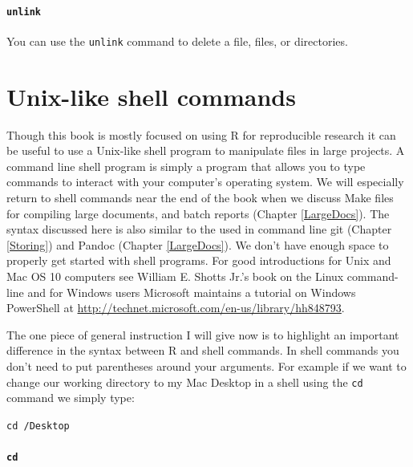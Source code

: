 \documentclass[ChapterTOCs,krantz1]{krantz}\usepackage{graphicx, color}
\makeatletter
\newenvironment{kframe}{%
 \def\at@end@of@kframe{}%
 \ifinner\ifhmode%
  \def\at@end@of@kframe{\end{minipage}}%
  \begin{minipage}{\columnwidth}%
 \fi\fi%
 \def\FrameCommand##1{\hskip\@totalleftmargin \hskip-\fboxsep
 \colorbox{shadecolor}{##1}\hskip-\fboxsep
     \hskip-\linewidth \hskip-\@totalleftmargin \hskip\columnwidth}%
 \MakeFramed {\advance\hsize-\width
   \@totalleftmargin\z@ \linewidth\hsize
   \@setminipage}}%
 {\par\unskip\endMakeFramed%
 \at@end@of@kframe}
\newenvironment{knitrout}{}{} %
\makeatother
\begin{document}
\paragraph{{\tt{unlink}}}

You can use the {\tt{unlink}} command to delete a file, files, or directories. 

\section{Unix-like shell commands} 

Though this book is mostly focused on using R for reproducible research it can be useful to use a Unix-like shell program to manipulate files in large projects. A command line shell program is simply a program that allows you to type commands to interact with your computer's operating system.\cite{ShottsJr2012} We will especially return to shell commands near the end of the book when we discuss Make files for compiling large documents, and batch reports (Chapter \ref{LargeDocs}). The syntax discussed here is also similar to the used in command line git (Chapter \ref{Storing}) and Pandoc (Chapter \ref{LargeDocs}). We don't have enough space to properly get started with shell programs. For good introductions for Unix and Mac OS 10 computers see William E. Shotts Jr.'s book on the Linux command-line\cite{ShottsJr2012} and for Windows users Microsoft maintains a tutorial on Windows PowerShell at \url{http://technet.microsoft.com/en-us/library/hh848793}.

The one piece of general instruction I will give now is to highlight an important difference in the syntax between R and shell commands. In shell commands you don't need to put parentheses around your arguments. For example if we want to change our working directory to my Mac Desktop in a shell using the {\tt{cd}} command we simply type:

\begin{knitrout}
\color{fgcolor}\begin{kframe}
\begin{alltt}
cd ~/Desktop
\end{alltt}
\end{kframe}
\end{knitrout}


\paragraph{{\tt{cd}}}
\end{document}
